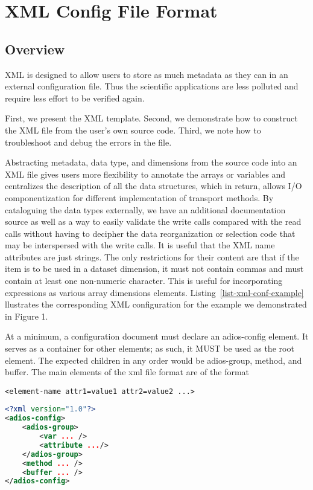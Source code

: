 \chapter{XML Config File Format}
\label{chapter-xml}

\section{Overview} 
XML is designed to allow users to store as much metadata as they can in an external 
configuration file. Thus the scientific applications are less polluted and require 
less effort to be verified again.

First, we present the XML template. Second, we demonstrate how to construct the 
XML file from the user's own source code. Third, we note how to troubleshoot and 
debug the errors in the file.  

Abstracting metadata, data type, and dimensions from the source code into an XML 
file gives users more flexibility to annotate the arrays or variables and centralizes 
the description of all the data structures, which in return, allows I/O componentization 
for different implementation of transport methods. By cataloguing the data types 
externally, we have an additional documentation source as well as a way to easily 
validate the write calls compared with the read calls without having to decipher 
the data reorganization or selection code that may be interspersed with the write 
calls. It is useful that the XML name attributes are just strings. The only restrictions 
for their content are that if the item is to be used in a dataset dimension, it 
must not contain commas and must contain at least one non-numeric character. This 
is useful for incorporating expressions as various array dimensions elements. Listing~\ref{list-xml-conf-example} llustrates the corresponding XML configuration for the example we demonstrated 
in Figure 1. 

At a minimum, a configuration document must declare an adios-config element. It 
serves as a container for other elements; as such, it MUST be used as the root 
element. The expected children in any order would be adios-group, method, and buffer. 
The main elements of the xml file format are of the format 

\begin{lstlisting}
<element-name attr1=value1 attr2=value2 ...>
\end{lstlisting}

\begin{lstlisting}[language=XML, caption={Example XML configuration}, label=list-xml-conf-example]
<?xml version="1.0"?>
<adios-config> 
    <adios-group>
        <var ... />
        <attribute .../>
    </adios-group>
    <method ... />
    <buffer ... />
</adios-config>
\end{lstlisting}


